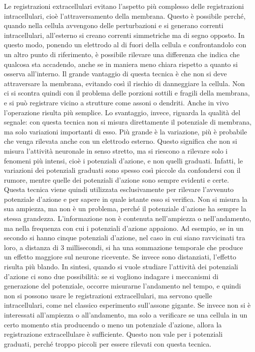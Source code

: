 \documentclass[12pt,a4paper,openany]{book}
\begin{document}
Le registrazioni extracellulari evitano l’aspetto più complesso delle registrazioni intracellulari, cioè l’attraversamento della membrana. Questo è possibile perché, quando nella cellula avvengono delle perturbazioni e si generano correnti intracellulari, all’esterno si creano correnti simmetriche ma di segno opposto. In questo modo, ponendo un elettrodo al di fuori della cellula e confrontandolo con un altro punto di riferimento, è possibile rilevare una differenza che indica che qualcosa sta accadendo, anche se in maniera meno chiara rispetto a quanto si osserva all’interno.
Il grande vantaggio di questa tecnica è che non si deve attraversare la membrana, evitando così il rischio di danneggiare la cellula. Non ci si scontra quindi con il problema delle porzioni sottili e fragili della membrana, e si può registrare vicino a strutture come assoni o dendriti. Anche in vivo l’operazione risulta più semplice. Lo svantaggio, invece, riguarda la qualità del segnale: con questa tecnica non si misura direttamente il potenziale di membrana, ma solo variazioni importanti di esso. Più grande è la variazione, più è probabile che venga rilevata anche con un elettrodo esterno. Questo significa che non si misura l’attività neuronale in senso stretto, ma si riescono a rilevare solo i fenomeni più intensi, cioè i potenziali d’azione, e non quelli graduati. Infatti, le variazioni dei potenziali graduati sono spesso così piccole da confondersi con il rumore, mentre quelle dei potenziali d’azione sono sempre evidenti e certe. Questa tecnica viene quindi utilizzata esclusivamente per rilevare l’avvenuto potenziale d’azione e per sapere in quale istante esso si verifica. Non si misura la sua ampiezza, ma non è un problema, perché il potenziale d’azione ha sempre la stessa grandezza. L’informazione non è contenuta nell’ampiezza o nell’andamento, ma nella frequenza con cui i potenziali d’azione appaiono. Ad esempio, se in un secondo si hanno cinque potenziali d’azione, nel caso in cui siano ravvicinati tra loro, a distanza di 3 millisecondi, si ha una sommazione temporale che produce un effetto maggiore sul neurone ricevente. Se invece sono distanziati, l’effetto risulta più blando.
In sintesi, quando si vuole studiare l’attività dei potenziali d’azione ci sono due possibilità: se si vogliono indagare i meccanismi di generazione del potenziale, occorre misurarne l’andamento nel tempo, e quindi non si possono usare le registrazioni extracellulari, ma servono quelle intracellulari, come nel classico esperimento sull’assone gigante. Se invece non si è interessati all’ampiezza o all’andamento, ma solo a verificare se una cellula in un certo momento stia producendo o meno un potenziale d’azione, allora la registrazione extracellulare è sufficiente. Questo non vale per i potenziali graduati, perché troppo piccoli per essere rilevati con questa tecnica.
\end{document}
